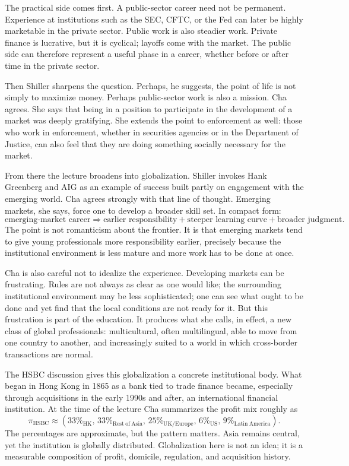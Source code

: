 The practical side comes first. A public-sector career need not be permanent. Experience at institutions such as the SEC, CFTC, or the Fed can later be highly marketable in the private sector. Public work is also steadier work. Private finance is lucrative, but it is cyclical; layoffs come with the market. The public side can therefore represent a useful phase in a career, whether before or after time in the private sector.

Then Shiller sharpens the question. Perhaps, he suggests, the point of life is not simply to maximize money. Perhaps public-sector work is also a mission. Cha agrees. She says that being in a position to participate in the development of a market was deeply gratifying. She extends the point to enforcement as well: those who work in enforcement, whether in securities agencies or in the Department of Justice, can also feel that they are doing something socially necessary for the market.

From there the lecture broadens into globalization. Shiller invokes Hank Greenberg and AIG as an example of success built partly on engagement with the emerging world. Cha agrees strongly with that line of thought. Emerging markets, she says, force one to develop a broader skill set. In compact form:
\begin{equation}
\text{emerging-market career}
\Rightarrow
\text{earlier responsibility}
+
\text{steeper learning curve}
+
\text{broader judgment}.
\end{equation}
The point is not romanticism about the frontier. It is that emerging markets tend to give young professionals more responsibility earlier, precisely because the institutional environment is less mature and more work has to be done at once.

Cha is also careful not to idealize the experience. Developing markets can be frustrating. Rules are not always as clear as one would like; the surrounding institutional environment may be less sophisticated; one can see what ought to be done and yet find that the local conditions are not ready for it. But this frustration is part of the education. It produces what she calls, in effect, a new class of global professionals: multicultural, often multilingual, able to move from one country to another, and increasingly suited to a world in which cross-border transactions are normal.

The HSBC discussion gives this globalization a concrete institutional body. What began in Hong Kong in 1865 as a bank tied to trade finance became, especially through acquisitions in the early 1990s and after, an international financial institution. At the time of the lecture Cha summarizes the profit mix roughly as
\begin{equation}
\pi_{\mathrm{HSBC}} \approx
(33\%_{\mathrm{HK}},\,
33\%_{\mathrm{Rest\ of\ Asia}},\,
25\%_{\mathrm{UK/Europe}},\,
6\%_{\mathrm{US}},\,
9\%_{\mathrm{Latin\ America}}).
\end{equation}
The percentages are approximate, but the pattern matters. Asia remains central, yet the institution is globally distributed. Globalization here is not an idea; it is a measurable composition of profit, domicile, regulation, and acquisition history.

